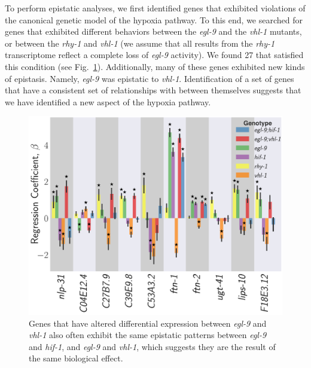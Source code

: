\documentclass[9pt,twocolumn,twoside]{pnas-new}
\newcommand{\egl}{\emph{egl-9}}
\newcommand{\rhy}{\emph{rhy-1}}
\newcommand{\vhl}{\emph{vhl-1}}
\newcommand{\hif}{\emph{hif-1}}
\newcommand{\hifohtargets}{27}
\begin{document}
To perform epistatic analyses, we first identified genes that exhibited violations
of the canonical genetic model of the hypoxia pathway. To this end, we searched for
genes that exhibited different behaviors between the \egl{} and the \vhl{}
mutants, or between the \rhy{} and \vhl{} (we assume that all results from the
\rhy{} transcriptome reflect a complete loss of \egl{} activity). We found
\hifohtargets{} that satisfied this condition (see Fig.~\ref{fig:hif1oh}).
Additionally, many of these genes exhibited new kinds of epistasis. Namely,
\egl{} was epistatic to \vhl{}. Identification of a set of genes that have a
consistent set of relationships with between themselves suggests that we have
identified a new aspect of the hypoxia pathway.

\begin{figure}[tbhp]
\centering
\includegraphics[width=\linewidth]{figs/hif1oh_epistasis.pdf}
\caption{
Genes that have altered differential expression between \egl{} and \vhl{} also
often exhibit the same epistatic patterns between \egl{} and \hif{}, and \egl{}
and \vhl{}, which suggests they are the result of the same biological effect.
}
\label{fig:hif1oh}
\end{figure}
\end{document}
